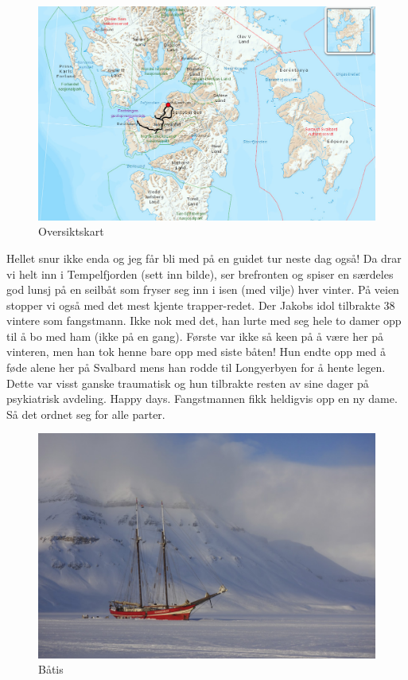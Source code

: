 \begin{figure}[h!]
\centering
\includegraphics[scale=0.22]{Turbarentsburgstor}
\caption{Oversiktskart}
\label{fig:barentsburgoversiktskart}
\end{figure}
Hellet snur ikke enda og jeg får bli med på en guidet tur neste dag
også! Da drar vi helt inn i Tempelfjorden (sett inn bilde), ser
brefronten og spiser en særdeles god lunsj på en seilbåt som fryser
seg inn i isen (med vilje) hver vinter. På veien stopper vi også med
det mest kjente trapper-redet. Der Jakobs idol tilbrakte 38 vintere
som fangstmann. Ikke nok med det, han lurte med seg hele to damer opp
til å bo med ham (ikke på en gang). Første var ikke så keen på å være her på vinteren,
men han tok henne bare opp med siste båten! Hun endte opp med å føde
alene her på Svalbard mens han rodde til Longyerbyen for å hente
legen. Dette var visst ganske traumatisk og hun tilbrakte resten av
sine dager på psykiatrisk avdeling. Happy days. Fangstmannen fikk
heldigvis opp en ny dame. Så det ordnet seg for alle parter.\\

\begin{figure}[h!]
	\centering
	\includegraphics[width=\textwidth]{baatis}
	\caption{Båtis}
\label{fig:båtis}
\end{figure}


